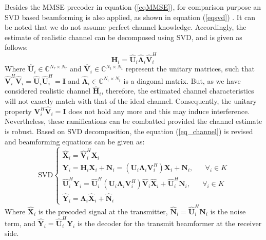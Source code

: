 Besides the MMSE precoder in equation (\ref{eqMMSE}), for comparison purpose an SVD based beamforming is also applied, as shown in equation (\ref{eqsvd}) . It can be noted that we do not assume perfect channel knowledge. Accordingly, the estimate of realistic channel can be decomposed using SVD, and is given as follows:  
\begin{equation}
 \mathbf{\hat{H}}_i=\mathbf{\hat{U}}_i \mathbf{\hat{\Lambda}}_i \mathbf{\hat{V}}_i^H
\label{eq-svd}
\end{equation}
Where $\mathbf{\hat{U}}_i\in \mathbb{C}^{N_r\times N_r}$ and $\mathbf{\hat{V}}_i\in \mathbb{C}^{N_t\times N_t}$ represent the unitary  matrices, such that $\mathbf{\hat{V}}_i^H\mathbf{\hat{V}}_i=\mathbf{\hat{U}}_i\mathbf{\hat{U}}_i^H = \mathbf{I}$ and
$\mathbf{\hat{\Lambda}}_i\in \mathbb{C}^{N_r\times N_t}$ is a diagonal matrix. But, as we have considered realistic channel $\mathbf{\hat{H}}_i$,  therefore, the estimated channel characteristics will not exactly match with that of the ideal channel. Consequently, the unitary property $\mathbf{{V}}_i^H\mathbf{\hat{V}}_i = \mathbf{I}$ does not hold any more and this may induce interference.  Nevertheless, these ramifications can be combatted provided the channel estimate is robust. Based on SVD decomposition, the equation (\ref{eq_channel}) is revised and beamforming equations can be given as: 
\begin{equation}
\text{SVD}
\begin{cases}
\mathbf{\hat{X}}_i= \mathbf{\hat{V}}_i^H  \mathbf{X}_i    \\
\mathbf{{Y}}_i=\mathbf{H}_i \mathbf{X}_i+\mathbf{N}_i=(\mathbf{U}_i \mathbf{\Lambda}_i \mathbf{V}_i^H)  \mathbf{X}_i+\mathbf{N}_i , \,\,\,\,\,\,\,\,\,\, \forall_i \in K\\
\mathbf{\hat{U}}_i^H\mathbf{{Y}}_i=\mathbf{\hat{U}}_i^H (\mathbf{U}_i \mathbf{\Lambda}_i \mathbf{V}_i^H)   \mathbf{\hat{V}}_i \mathbf{\hat{X}}_i+\mathbf{\hat{U}}_i^H\mathbf{N}_i, \,\,\,\,\,\,\,\,\,\, \forall_i \in K\\
\mathbf{\hat{Y}}_i= \mathbf{\Lambda}_i \mathbf{\hat{X}}_i+\mathbf{\hat{N}}_i
\end{cases}
\label{eqsvd}
\end{equation}
Where $\mathbf{\hat{X}}_i$ is the precoded signal at the transmitter, $\mathbf{\hat{N}}_i= \mathbf{\hat{U}}_i^H\mathbf{N}_i$ is the noise term, and $\mathbf{\hat{Y}}_i =\mathbf{\hat{U}}_i^H\mathbf{{Y}}_i$ is the decoder for the transmit beamformer at the receiver side. 

